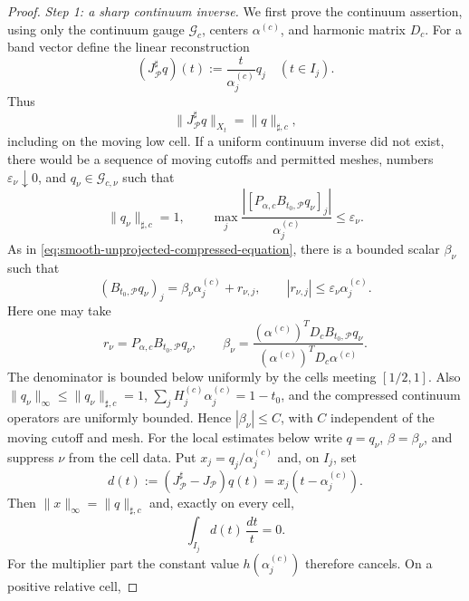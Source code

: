 \documentclass[11pt]{article}
\numberwithin{equation}{section}
\theoremstyle{definition}
\theoremstyle{remark}
\newcommand{\1}{\mathbf 1}
\begin{document}
\begin{proof}
\emph{Step 1: a sharp continuum inverse.}\quad
We first prove the continuum assertion, using only the continuum gauge
\(\mathcal G_c\), centers \(\alpha^{(c)}\), and harmonic matrix \(D_c\).
For a band vector define the
linear reconstruction
\begin{equation}
 (J_{\mathcal P}^\sharp q)(t):=\frac{t}{\alpha_j^{(c)}}q_j
       \quad(t\in I_j).
 \label{eq:smooth-linear-cell-reconstruction}
\end{equation}
Thus
\begin{equation}
 \|J_{\mathcal P}^\sharp q\|_{X_t}=\|q\|_{\sharp,c},
 \label{eq:smooth-sharp-reconstruction-isometry}
\end{equation}
including on the moving low cell.  If a uniform continuum inverse did
not exist, there would be a sequence of moving cutoffs and permitted
meshes, numbers \(\varepsilon_\nu\downarrow0\), and
\(q_\nu\in\mathcal G_{c,\nu}\) such that
\[
 \|q_\nu\|_{\sharp,c}=1,\qquad
 \max_j\frac{|[P_{\alpha,c}B_{t_0,\mathcal P}q_\nu]_j|}
                  {\alpha_j^{(c)}}\leq\varepsilon_\nu.
\]
As in \eqref{eq:smooth-unprojected-compressed-equation}, there is a
bounded scalar \(\beta_\nu\) such that
\begin{equation}
 (B_{t_0,\mathcal P}q_\nu)_j
 =\beta_\nu\alpha_j^{(c)}+r_{\nu,j},\qquad
 |r_{\nu,j}|\leq\varepsilon_\nu\alpha_j^{(c)}.
 \label{eq:smooth-weighted-unprojected-equation}
\end{equation}
Here one may take
\[
 r_\nu=P_{\alpha,c}B_{t_0,\mathcal P}q_\nu,\qquad
 \beta_\nu=
 \frac{(\alpha^{(c)})^TD_cB_{t_0,\mathcal P}q_\nu}
      {(\alpha^{(c)})^TD_c\alpha^{(c)}}.
\]
The denominator is bounded below uniformly by the cells meeting
\([1/2,1]\).  Also
\(\|q_\nu\|_\infty\leq\|q_\nu\|_{\sharp,c}=1\),
\(\sum_jH_j^{(c)}\alpha_j^{(c)}=1-t_0\), and the compressed continuum
operators are uniformly bounded.  Hence \(|\beta_\nu|\leq C\), with \(C\)
independent of the moving cutoff and mesh.
For the local estimates below write \(q=q_\nu\),
\(\beta=\beta_\nu\), and suppress \(\nu\) from the cell data.  Put
\(x_j=q_j/\alpha_j^{(c)}\) and, on \(I_j\), set
\[
 d(t):=(J_{\mathcal P}^\sharp-J_{\mathcal P})q(t)
      =x_j(t-\alpha_j^{(c)}).
\]
Then \(\|x\|_\infty=\|q\|_{\sharp,c}\) and, exactly on every cell,
\begin{equation}
 \int_{I_j}d(t)\,\frac{dt}{t}=0.
 \label{eq:smooth-sharp-cell-centering}
\end{equation}
For the multiplier part the constant value
\(h(\alpha_j^{(c)})\) therefore cancels.  On a positive relative cell,

\end{proof}
\end{document}
